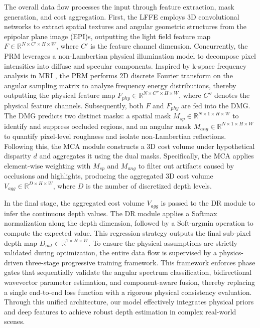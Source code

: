 \documentclass[lettersize,journal]{IEEEtran}
\begin{document}
The overall data flow processes the input through feature extraction, mask generation, and cost aggregation. First, the LFFE employs 3D convolutional networks to extract spatial textures and angular geometric structures from the epipolar plane image (EPI)s, outputting the light field feature map $F \in \mathbb{R}^{N \times C' \times H \times W}$, where $C'$ is the feature channel dimension. Concurrently, the PRM leverages a non-Lambertian physical illumination model to decompose pixel intensities into diffuse and specular components. Inspired by k-space frequency analysis in MRI , the PRM performs 2D discrete Fourier transform on the angular sampling matrix to analyze frequency energy distributions, thereby outputting the physical feature map $F_{phy} \in \mathbb{R}^{N \times C'' \times H \times W}$, where $C''$ denotes the physical feature channels. Subsequently, both $F$ and $F_{phy}$ are fed into the DMG. The DMG predicts two distinct masks: a spatial mask $M_{sp} \in \mathbb{R}^{N \times 1 \times H \times W}$ to identify and suppress occluded regions, and an angular mask $M_{ang} \in \mathbb{R}^{N \times 1 \times H \times W}$ to quantify pixel-level roughness and isolate non-Lambertian reflections. Following this, the MCA module constructs a 3D cost volume under hypothetical disparity $d$ and aggregates it using the dual masks. Specifically, the MCA applies element-wise weighting with $M_{sp}$ and $M_{ang}$ to filter out artifacts caused by occlusions and highlights, producing the aggregated 3D cost volume $V_{agg} \in \mathbb{R}^{D \times H \times W}$, where $D$ is the number of discretized depth levels.

In the final stage, the aggregated cost volume $V_{agg}$ is passed to the DR module to infer the continuous depth values. The DR module applies a Softmax normalization along the depth dimension, followed by a Soft-argmin operation to compute the expected value. This regression strategy outputs the final sub-pixel depth map $D_{out} \in \mathbb{R}^{1 \times H \times W}$. To ensure the physical assumptions are strictly validated during optimization, the entire data flow is supervised by a physics-driven three-stage progressive training framework. This framework enforces phase gates that sequentially validate the angular spectrum classification, bidirectional wavevector parameter estimation, and component-aware fusion, thereby replacing a single end-to-end loss function with a rigorous physical consistency evaluation. Through this unified architecture, our model effectively integrates physical priors and deep features to achieve robust depth estimation in complex real-world scenes.
\end{document}
